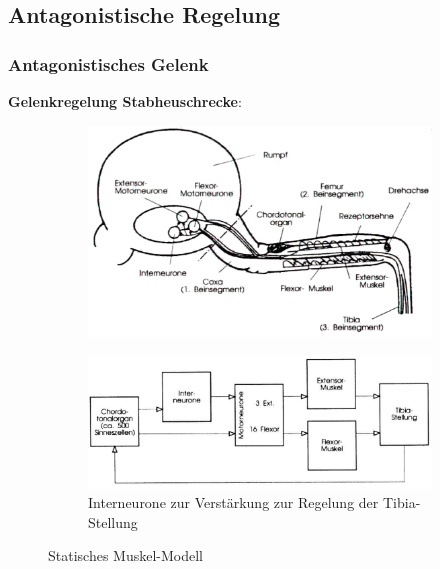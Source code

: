 \subsection{Antagonistische Regelung}
\subsubsection{Antagonistisches Gelenk}
\textbf{Gelenkregelung Stabheuschrecke}:
\begin{figure}[h!]
	\centering
	\begin{subfigure}{.5\textwidth}
		\includegraphics[width=\linewidth]{figures/ch03_Gelenkregelung-Stabheuschrecke.png}
		\caption{}
	\end{subfigure}
	\begin{subfigure}{.5\textwidth}
		\includegraphics[width=\linewidth]{figures/ch03_Gelenkregelung-Stabheuschrecke1.png}
		\caption{Interneurone zur Verstärkung zur Regelung der Tibia-Stellung}
	\end{subfigure}
	\caption{Statisches Muskel-Modell}
	\label{grhs}
\end{figure}\\
